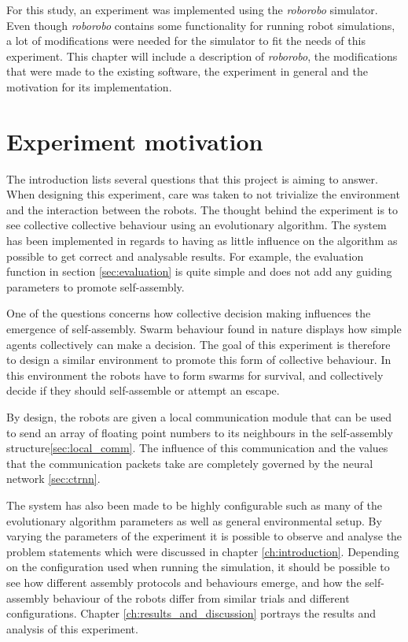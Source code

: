 For this study, an experiment was implemented using the \emph{roborobo} simulator\cite{bredeche_roborobo!_2013}.
Even though \emph{roborobo} contains some functionality for running robot simulations, a lot of modifications were needed for the simulator to fit the needs of this experiment.
This chapter will include a description of \emph{roborobo}, the modifications that were made to the existing software, the experiment in general and the motivation for its implementation.

\section{Experiment motivation}
The introduction lists several questions that this project is aiming to answer.
When designing this experiment, care was taken to not trivialize the environment and the interaction between the robots.
The thought behind the experiment is to see collective collective behaviour using an evolutionary algorithm.
The system has been implemented in regards to having as little influence on the algorithm as possible to get correct and analysable results.
For example, the evaluation function in section \ref{sec:evaluation} is quite simple and does not add any guiding parameters to promote self-assembly.

One of the questions concerns how collective decision making influences the emergence of self-assembly.
Swarm behaviour found in nature displays how simple agents collectively can make a decision.
The goal of this experiment is therefore to design a similar environment to promote this form of collective behaviour.
In this environment the robots have to form swarms for survival, and collectively decide if they should self-assemble or attempt an escape.

By design, the robots are given a local communication module that can be used to send an array of floating point numbers to its neighbours in the self-assembly structure\ref{sec:local_comm}.
The influence of this communication and the values that the communication packets take are completely governed by the neural network \ref{sec:ctrnn}.

The system has also been made to be highly configurable such as many of the evolutionary algorithm parameters as well as general environmental setup. 
By varying the parameters of the experiment it is possible to observe and analyse the problem statements which were discussed in chapter \ref{ch:introduction}.
Depending on the configuration used when running the simulation, it should be possible to see how different assembly protocols and behaviours emerge, and how the self-assembly behaviour of the robots differ from similar trials and different configurations.
Chapter \ref{ch:results_and_discussion} portrays the results and analysis of this experiment.


